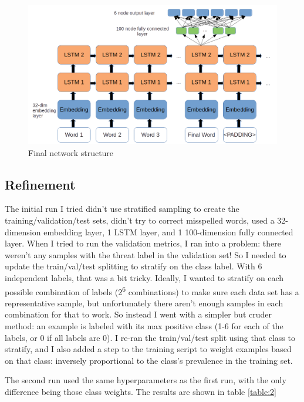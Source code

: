\documentclass[12pt]{article}
\begin{document}
\begin{figure}
\centering
\includegraphics[width=\textwidth]{network}
\caption{Final network structure}
\label{fig:network}
\end{figure}

\subsection*{Refinement}
\label{sec:org4a1a052}
The initial run I tried didn't use stratified sampling to create the training/validation/test sets, didn't try to correct misspelled words, used a 32-dimension embedding layer, 1 LSTM layer, and 1 100-dimension fully connected layer. When I tried to run the validation metrics, I ran into a problem: there weren't any samples with the threat label in the validation set! So I needed to update the train/val/test splitting to stratify on the class label. With 6 independent labels, that was a bit tricky. Ideally, I wanted to stratify on each possible combination of labels (2\textsuperscript{6} combinations) to make sure each data set has a representative sample, but unfortunately there aren't enough samples in each combination for that to work. So instead I went with a simpler but cruder method: an example is labeled with its max positive class (1-6 for each of the labels, or 0 if all labels are 0). I re-ran the train/val/test split using that class to stratify, and I also added a step to the training script to weight examples based on that class: inversely proportional to the class's prevalence in the training set.

The second run used the same hyperparameters as the first run, with the only difference being those class weights. The results are shown in table \ref{table:2}
\end{document}
